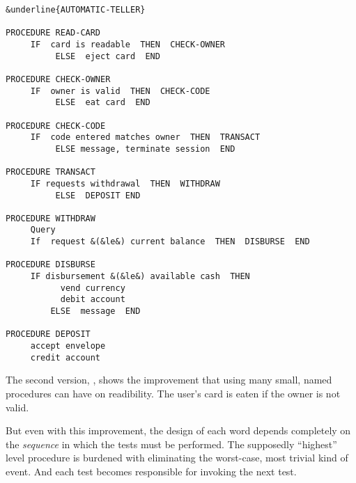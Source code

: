 \begin{figure*}[tttt]
\small\begin{center}
\begin{BVerbatim}[commandchars=\&\{\},baselinestretch=0.85]
&underline{AUTOMATIC-TELLER}

PROCEDURE READ-CARD
     IF  card is readable  THEN  CHECK-OWNER
          ELSE  eject card  END

PROCEDURE CHECK-OWNER
     IF  owner is valid  THEN  CHECK-CODE
          ELSE  eat card  END

PROCEDURE CHECK-CODE
     IF  code entered matches owner  THEN  TRANSACT
          ELSE message, terminate session  END

PROCEDURE TRANSACT
     IF requests withdrawal  THEN  WITHDRAW
          ELSE  DEPOSIT END

PROCEDURE WITHDRAW
     Query
     If  request &(&le&) current balance  THEN  DISBURSE  END

PROCEDURE DISBURSE
     IF disbursement &(&le&) available cash  THEN
           vend currency
           debit account
         ELSE  message  END

PROCEDURE DEPOSIT
     accept envelope
     credit account
\end{BVerbatim}
\end{center}
\end{figure*}
The second version, , shows the improvement that using
many small, named procedures can have on readibility. The user's card is
eaten if the owner is not valid.

But even with this improvement, the design of each word depends
completely on the \emph{sequence} in which the tests must be performed. The
supposedly ``highest'' level procedure is burdened with eliminating the
worst-case, most trivial kind of event. And each test becomes responsible
for invoking the next test.

